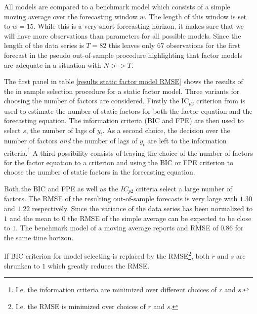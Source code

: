 \documentclass[11pt]{article}
\begin{document}
All models are compared to a benchmark model which consists of a simple moving average over the forecasting window $w$. The length of this window is set to $w=15$. While this is a very short forecasting horizon, it makes sure that we will have more observations than parameters for all possible models. Since the length of the data series is $T=82$ this leaves only $67$ observations for the first forecast in the pseudo out-of-sample procedure highlighting that factor models are adequate in a situation with $N>>T$.

The first panel in table \ref{results static factor model RMSE} shows the results of the in sample selection procedure for a static factor model. Three variants for choosing the number of factors are considered. Firstly the IC$_{p2}$ criterion from \citet{bai2002determining} is used to estimate the number of static factors for both the factor equation and the forecasting equation. The information criteria (BIC and FPE) are then used to select $s$, the number of lags of $y_t$.
As a second choice, the decision over the number of factors \textit{and} the number of lags of $y_t$ are left to the information criteria.\footnote{I.e. the information criteria are minimized over different choices of $r$ and $s$.}
A third possibility consists of leaving the choice of the number of factors for the factor equation to a \citet{bai2002determining} criterion and using the BIC or FPE criterion to choose the number of static factors in the forecasting equation.

Both the BIC and FPE as well as the $IC_{p2}$ criteria select a large number of factors. The RMSE of the resulting out-of-sample forecasts is very large with $1.30$ and $1.22$ respectively. Since the variance of the data series has been normalized to $1$ and the mean to $0$ the RMSE of the simple average can be expected to be close to $1$. The benchmark model of a moving average reports and RMSE of $0.86$ for the same time horizon.

If BIC criterion for model selecting is replaced by the RMSE\footnote{I.e. the RMSE is minimized over choices of $r$ and $s$.}, both $r$ and $s$ are shrunken to $1$ which greatly reduces the RMSE.
\end{document}
